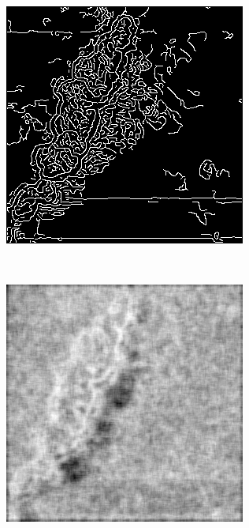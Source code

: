 \documentclass[../main.tex]{subfiles}
\begin{document}
\begin{figure}[!ht]
\begin{subfigure}{0.3\linewidth}
	\end{subfigure}
	\hfill
	\begin{subfigure}{0.3\linewidth}
		\centering
		\includegraphics[keepaspectratio, width=\linewidth]{images/bm3d_edge.png}
	\end{subfigure}\\[20pt]
	\begin{subfigure}{0.3\linewidth}
		\centering
		\includegraphics[keepaspectratio, width=\linewidth]{images/orig_entropy.png}

\end{subfigure}
\end{figure}
\end{document}
